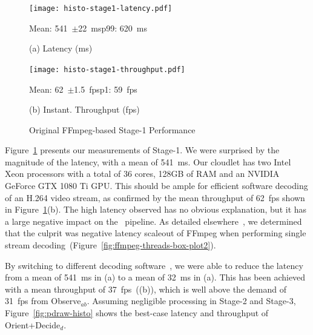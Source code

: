 \begin{figure}
\centering
\begin{minipage}[b]{0.49\linewidth}
\centering
\texttt{[image: histo-stage1-latency.pdf]}\\
\begin{captext}
\centering
Mean: 541~$\pm$22~ms\hspace{0.1in}p99: 620~ms\\
\end{captext}
\vspace{-0.05in}
{\small (a) Latency (ms)}
\end{minipage}
\begin{minipage}[b]{0.49\linewidth}
\centering
\texttt{[image: histo-stage1-throughput.pdf]}\\
\begin{captext}
\centering
Mean: 62~$\pm$1.5~fps\hspace{0.1in}p1: 59~fps\\
\end{captext}
\vspace{-0.05in}
{\small (b) Instant. Throughput (fps)}
\end{minipage}
\vspace{-0.15in}
\caption{\small Original FFmpeg-based Stage-1 Performance}
\label{fig:stage1-histo}
\vspace{-0.1in}
\end{figure}


Figure~\ref{fig:stage1-histo} presents our measurements of Stage-1. We
were surprised by the magnitude of the latency, with a mean of 541~ms.
Our cloudlet has two Intel Xeon processors with a total of 36 cores,
128GB of RAM and an NVIDIA GeForce GTX 1080 Ti GPU. This should be
ample for efficient software decoding of an H.264 video stream, as
confirmed by the mean throughput of 62~fps shown in
Figure~\ref{fig:stage1-histo}(b).  The high latency observed has no
obvious explanation, but it has a large negative impact on the
\ooda~pipeline.  As detailed elsewhere~\cite{Chanana2024}, we
determined that the culprit was negative latency scaleout of FFmpeg
when performing single stream
decoding~(Figure~\ref{fig:ffmpeg-threads-box-plot2}).

By switching to  different decoding software~\cite{PDrAW2024}, we
were able to reduce the latency from a mean of 541~ms in
(a) to a mean of 32~ms in
(a).  This has been achieved with a mean
throughput of 37~fps~((b)), which is well above
the demand of 31~fps from Observe$_{ab}$.  Assuming negligible
processing in Stage-2 and Stage-3, Figure~\ref{fig:pdraw-histo} shows
the best-case latency and throughput of Orient+Decide$_d$.

